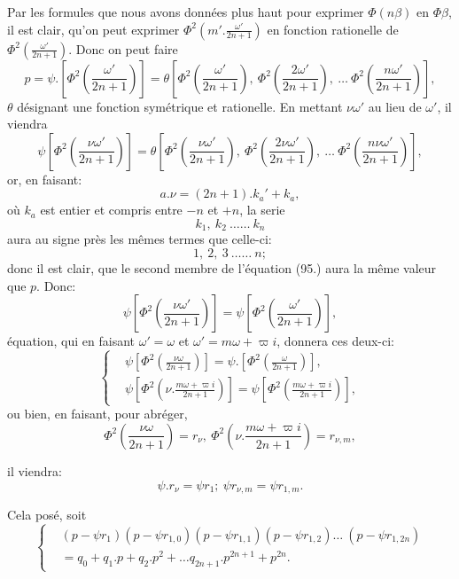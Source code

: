 \documentclass{article}
\begin{document}
Par les formules que nous avons données plus haut pour exprimer $\Phi(n\beta)$ en $\Phi\beta$, il est clair, qu'on peut exprimer $\Phi^{2}\left(m'.\frac{\omega'}{2n+1}\right)$ en fonction rationelle de $\Phi^{2}\left(\frac{\omega'}{2n+1}\right)$. Donc on peut faire
\[ p=\psi.\left[\Phi^{2}\left(\frac{\omega'}{2n+1}\right)\right]=\theta\left[\Phi^{2}\left(\frac{\omega'}{2n+1}\right),\ \Phi^{2}\left(\frac{2\omega'}{2n+1}\right),\ \ldots\ \Phi^{2}\left(\frac{n\omega'}{2n+1}\right)\right], \tag{94.} \]
$\theta$ désignant une fonction symétrique et rationelle. En mettant $\nu\omega'$ au lieu de $\omega'$, il viendra
\[ \psi\left[\Phi^{2}\left(\frac{\nu\omega'}{2n+1}\right)\right]=\theta\left[\Phi^{2}\left(\frac{\nu\omega'}{2n+1}\right),\ \Phi^{2}\left(\frac{2\nu\omega'}{2n+1}\right),\ \ldots\ \Phi^{2}\left(\frac{n\nu\omega'}{2n+1}\right)\right], \tag{95.} \]
or, en faisant:
\[ a.\nu=(2n+1).k_{a}'+k_{a}, \]
où $k_{a}$ est entier et compris entre $-n$ et $+n$, la serie
\[ k_{1},\ k_{2}\ \ldots\ldots\ k_{n} \]
aura au signe près les mêmes termes que celle-ci:
\[ 1,\ 2,\ 3\ \ldots\ldots\ n; \]
donc il est clair, que le second membre de l'équation (95.) aura la même valeur que $p$. Donc:
\[ \psi\left[\Phi^{2}\left(\frac{\nu\omega'}{2n+1}\right)\right]=\psi\left[\Phi^{2}\left(\frac{\omega'}{2n+1}\right)\right], \tag{96.} \]
équation, qui en faisant $\omega'=\omega$ et $\omega'=m\omega+\varpi i$, donnera ces deux-ci:
\[ \left\{\begin{aligned}
&\psi\left[\Phi^{2}\left(\frac{\nu\omega}{2n+1}\right)\right]=\psi.\left[\Phi^{2}\left(\frac{\omega}{2n+1}\right)\right],\\
&\psi\left[\Phi^{2}\left(\nu.\frac{m\omega+\varpi i}{2n+1}\right)\right]=\psi\left[\Phi^{2}\left(\frac{m\omega+\varpi i}{2n+1}\right)\right],
\end{aligned}\right. \tag{97.} \]
ou bien, en faisant, pour abréger,
\[ \Phi^{2}\left(\frac{\nu\omega}{2n+1}\right)=r_{\nu},\ \Phi^{2}\left(\nu.\frac{m\omega+\varpi i}{2n+1}\right)=r_{\nu,m}, \tag{98.} \]

il viendra:
\[ \psi.r_{\nu}=\psi r_{1};\ \psi r_{\nu,m}=\psi r_{1,m}. \tag{99.} \]

Cela posé, soit
\[ \left\{\begin{aligned}
&(p-\psi r_{1})(p-\psi r_{1,0})(p-\psi r_{1,1})(p-\psi r_{1,2})\ldots\ (p-\psi r_{1,2n})\\
&=q_{0}+q_{1}.p+q_{2}.p^{2}+\ldots q_{2n+1}.p^{2n+1}+p^{2n}.
\end{aligned}\right. \tag{100.} \]
\end{document}
